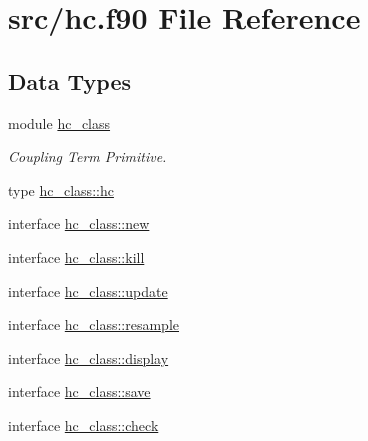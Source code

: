 \hypertarget{hc_8f90}{\section{src/hc.f90 File Reference}
\label{hc_8f90}
}
\subsection*{Data Types}
\begin{DoxyCompactItemize}
\item 
module \hyperlink{classhc__class}{hc\-\_\-class}
\begin{DoxyCompactList}\small\item\em Coupling Term Primitive. \end{DoxyCompactList}\item 
type \hyperlink{structhc__class_1_1hc}{hc\-\_\-class\-::hc}
\item 
interface \hyperlink{interfacehc__class_1_1new}{hc\-\_\-class\-::new}
\item 
interface \hyperlink{interfacehc__class_1_1kill}{hc\-\_\-class\-::kill}
\item 
interface \hyperlink{interfacehc__class_1_1update}{hc\-\_\-class\-::update}
\item 
interface \hyperlink{interfacehc__class_1_1resample}{hc\-\_\-class\-::resample}
\item 
interface \hyperlink{interfacehc__class_1_1display}{hc\-\_\-class\-::display}
\item 
interface \hyperlink{interfacehc__class_1_1save}{hc\-\_\-class\-::save}
\item 
interface \hyperlink{interfacehc__class_1_1check}{hc\-\_\-class\-::check}
\end{DoxyCompactItemize}
